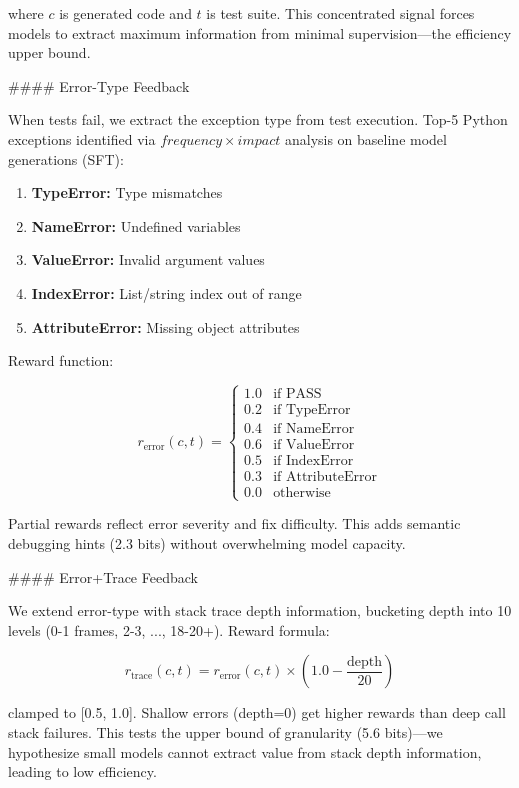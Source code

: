 where $c$ is generated code and $t$ is test suite. This concentrated signal forces models to extract maximum information from minimal supervision---the efficiency upper bound.

\#\#\#\# Error-Type Feedback

When tests fail, we extract the exception type from test execution. Top-5 Python exceptions identified via $frequency\times impact$ analysis on baseline model generations (SFT):

\begin{enumerate}
\item \textbf{TypeError:} Type mismatches
\item \textbf{NameError:} Undefined variables
\item \textbf{ValueError:} Invalid argument values
\item \textbf{IndexError:} List/string index out of range
\item \textbf{AttributeError:} Missing object attributes
\end{enumerate}

Reward function:

$$r_{\text{error}}(c, t) = \begin{cases} 1.0 & \text{if PASS} \\ 0.2 & \text{if TypeError} \\ 0.4 & \text{if NameError} \\ 0.6 & \text{if ValueError} \\ 0.5 & \text{if IndexError} \\ 0.3 & \text{if AttributeError} \\ 0.0 & \text{otherwise} \end{cases}$$

Partial rewards reflect error severity and fix difficulty. This adds semantic debugging hints (2.3 bits) without overwhelming model capacity.

\#\#\#\# Error+Trace Feedback

We extend error-type with stack trace depth information, bucketing depth into 10 levels (0-1 frames, 2-3, ..., 18-20+). Reward formula:

$$r_{\text{trace}}(c, t) = r_{\text{error}}(c, t) \times \left(1.0 - \frac{\text{depth}}{20}\right)$$

clamped to [0.5, 1.0]. Shallow errors (depth=0) get higher rewards than deep call stack failures. This tests the upper bound of granularity (5.6 bits)---we hypothesize small models cannot extract value from stack depth information, leading to low efficiency.

